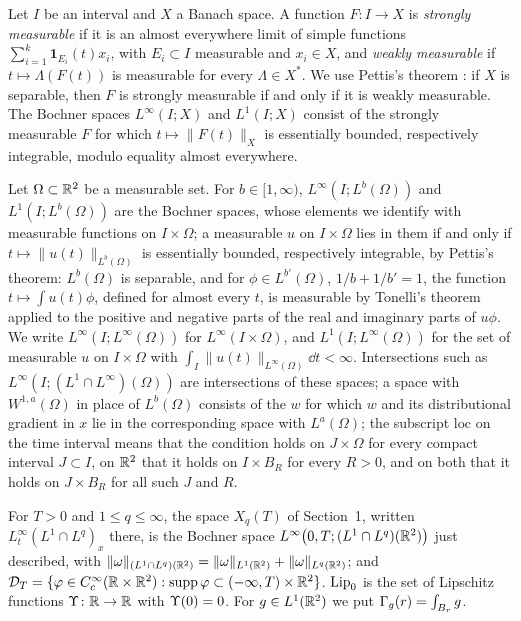 Let $I$ be an interval and $X$ a Banach space. A function $F\colon I\to X$ is
\textit{strongly measurable} if it is an almost everywhere limit of simple
functions $\sum_{i=1}^k\mathbf 1_{E_i}(t)x_i$, with $E_i\subset I$ measurable
and $x_i\in X$, and \textit{weakly measurable} if $t\mapsto\Lambda(F(t))$ is
measurable for every $\Lambda\in X^*$. We use Pettis's theorem \cite{Pettis}:
if $X$ is separable, then $F$ is strongly measurable if and only if it is weakly
measurable. The Bochner spaces $L^\infty(I;X)$ and $L^1(I;X)$ consist of the
strongly measurable $F$ for which $t\mapsto\|F(t)\|_X$ is essentially bounded,
respectively integrable, modulo equality almost everywhere.

Let $\Omega\subset\mathbb{R}^2$ be a measurable set. For
$b\in[1,\infty)$, $L^\infty(I;L^b(\Omega))$ and $L^1(I;L^b(\Omega))$ are the
Bochner spaces, whose elements we identify with measurable functions on
$I\times\Omega$; a measurable $u$ on $I\times\Omega$ lies in them if and only if
$t\mapsto\|u(t)\|_{L^b(\Omega)}$ is essentially bounded, respectively
integrable, by Pettis's theorem: $L^b(\Omega)$ is separable, and for
$\phi\in L^{b'}(\Omega)$, $1/b+1/b'=1$, the function $t\mapsto\int u(t)\phi$,
defined for almost every $t$, is measurable by Tonelli's theorem applied to the
positive and negative parts of the real and imaginary parts of $u\phi$. We write $L^\infty(I;L^\infty(\Omega))$
for $L^\infty(I\times\Omega)$, and $L^1(I;L^\infty(\Omega))$ for the set of
measurable $u$ on $I\times\Omega$ with $\int_I\|u(t)\|_{L^\infty(\Omega)}\dd t<\infty$.
Intersections such as $L^\infty(I;(L^1\cap L^\infty)(\Omega))$ are intersections of these
spaces; a space with $W^{1,a}(\Omega)$ in place of $L^b(\Omega)$ consists of the
$w$ for which $w$ and its distributional gradient in $x$ lie in the
corresponding space with $L^a(\Omega)$; the subscript $\mathrm{loc}$ on the time
interval means that the condition holds on $J\times\Omega$ for every compact
interval $J\subset I$, on $\mathbb{R}^2$ that it holds on $I\times B_R$ for every $R>0$,
and on both that it holds on $J\times B_R$ for all such $J$ and $R$.

For $T>0$ and $1\le q\le\infty$, the space $X_q(T)$ of Section~1, written
$L^\infty_t(L^1\cap L^q)_x$ there, is the Bochner space
$L^\infty\big(0,T;(L^1\cap L^q)(\mathbb{R}^2)\big)$ just described, with
$\|\omega\|_{(L^1\cap L^q)(\mathbb{R}^2)}=\|\omega\|_{L^1(\mathbb{R}^2)}+\|\omega\|_{L^q(\mathbb{R}^2)}$; and
$\mathcal{D}_T=\{\varphi\in C_c^\infty(\mathbb{R}\times\mathbb{R}^2):\operatorname{supp}\varphi\subset(-\infty,T)\times\mathbb{R}^2\}$.
$\mathrm{Lip}_0$ is the set of Lipschitz functions $\Upsilon\colon\mathbb{R}\to\mathbb{R}$ with $\Upsilon(0)=0$.
For $g\in L^1(\mathbb{R}^2)$ we put $\Gamma_g(r)=\int_{B_r}g$.

